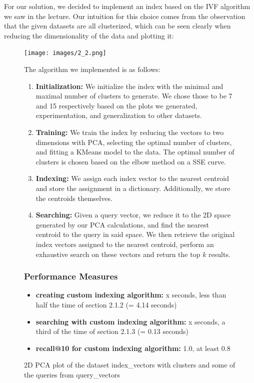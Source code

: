 \documentclass[12pt]{article}
\begin{document}
For our solution, we decided to implement an index based on the IVF algorithm we saw in the lecture. 
Our intuition for this choice comes from the observation that the given datasets are all clusterized, which can be seen clearly when reducing the dimensionality of the data and plotting it:


\begin{figure}[H]
    \centering
    \texttt{[image: images/2\_2.png]}
    \caption{2D PCA plot of the dataset index_vectors with clusters and some of the queries from query_vectors}

The algorithm we implemented is as follows:

\begin{enumerate}
    \item \textbf{Initialization:} We initialize the index with the minimal and maximal number of clusters to generate. We chose those to be 7 and 15 respectively based on the plots we generated, experimentation, and generalization to other datasets.
    \item \textbf{Training:} We train the index by reducing the vectors to two dimensions with PCA, selecting the optimal number of clusters, and fitting a KMeans model to the data. The optimal number of clusters is chosen based on the elbow method on a SSE curve.
    \item \textbf{Indexing:} We assign each index vector to the nearest centroid and store the assignment in a dictionary. Additionally, we store the centroids themselves.
    \item \textbf{Searching:} Given a query vector, we reduce it to the 2D space generated by our PCA calculations, and find the nearest centroid to the query in said space. We then retrieve the original index vectors assigned to the nearest centroid, perform an exhaustive search on these vectors and return the top $k$ results.
\end{enumerate}

\subsubsection*{Performance Measures}

\begin{itemize}
    \item \textbf{creating custom indexing algorithm:} x seconds, less than half the time of section 2.1.2 (= 4.14 seconds)
    \item \textbf{searching with custom indexing algorithm:} x seconds, a third of the time of section 2.1.3 (= 0.13 seconds)
    \item \textbf{recall@10 for custom indexing algorithm:} 1.0, at least 0.8
\end{itemize}




\end{figure}
\end{document}
